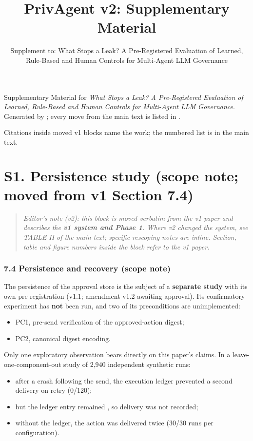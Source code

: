 \documentclass[10pt]{article}
\title{PrivAgent v2: Supplementary Material}
\author{Supplement to: What Stops a Leak? A Pre-Registered Evaluation of Learned, Rule-Based and Human
Controls for Multi-Agent LLM Governance}
\date{}
\begin{document}
\maketitle

Supplementary Material for \emph{What Stops a Leak? A Pre-Registered Evaluation of Learned, Rule-Based and Human Controls for Multi-Agent LLM Governance}. Generated by ; every move from the main text is listed in .

Citations inside moved v1 blocks name the work; the numbered list is in the main text.

\section*{S1. Persistence study (scope note; moved from v1 Section 7.4)}

\begin{quote}\small \emph{Editor's note (v2): this block is moved verbatim from the v1 paper and describes the \textbf{v1 system and Phase 1}. Where v2 changed the system, see TABLE II of the main text; specific rescoping notes are inline. Section, table and figure numbers inside the block refer to the v1 paper.}\end{quote}

\subsubsection*{7.4 Persistence and recovery (scope note)}

The persistence of the approval store is the subject of a \textbf{separate study} with its own pre-registration (v1.1; amendment v1.2 awaiting approval). Its confirmatory experiment has \textbf{not} been run, and two of its preconditions are unimplemented:

\begin{itemize}
\item PC1, pre-send verification of the approved-action digest;
\item PC2, canonical digest encoding.
\end{itemize}

Only one exploratory observation bears directly on this paper's claims. In a leave-one-component-out study of 2,940 independent synthetic runs:

\begin{itemize}
\item after a crash following the send, the execution ledger prevented a second delivery on retry (0/120);
\item but the ledger entry remained , so delivery was not recorded;
\item without the ledger, the action was delivered twice (30/30 runs per configuration).
\end{itemize}
\end{document}
